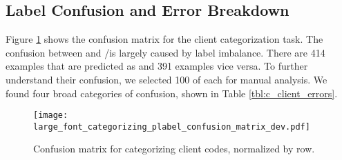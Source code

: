 \subsection{Label Confusion and Error Breakdown}
\label{ssec:label_confusion}


Figure \ref{fig:categorizing_confusion_client} shows the confusion
matrix for the client categorization task. The confusion between \FN
and \CHANGE/\SUSTAIN is largely caused by label imbalance. There are 414 \CHANGE examples that are predicted as \SUSTAIN
and 391 examples vice versa. To further understand their confusion, we
selected 100 of each for manual analysis. We found four broad
categories of confusion, shown in Table
\ref{tbl:c_client_errors}.

\begin{figure}[!tbp]
\begin{center}
  \texttt{[image: large\_font\_categorizing\_plabel\_confusion\_matrix\_dev.pdf]}
\end{center}
  \caption{\label{fig:categorizing_confusion_client} Confusion matrix for categorizing client codes, normalized by row.}
\end{figure}

